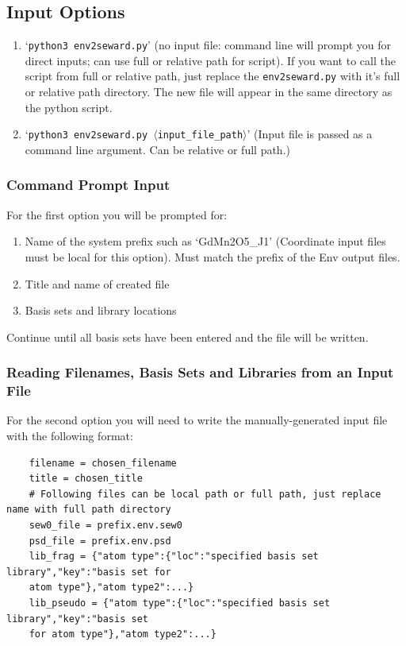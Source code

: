 \subsection{Input Options}

\begin{enumerate}
	\item `\texttt{python3 env2seward.py}' (no input file: command line will prompt you for direct inputs; can use full or relative path for script). If you want to call the script from full or relative path, just replace the \texttt{env2seward.py} with it's full or relative path directory. The new file will appear in the same directory as the python script.
	\item `\texttt{python3 env2seward.py $\langle$input\_file\_path$\rangle$}' (Input file is passed as a command line argument. Can be relative or full path.)
\end{enumerate}

\subsubsection{Command Prompt Input}
For the first option you will be prompted for:

\begin{enumerate}
	\item Name of the system prefix such as `GdMn2O5\_J1' (Coordinate input files must be local for this option). Must match the prefix of the Env output files.
	\item Title and name of created file
	\item Basis sets and library locations
\end{enumerate} 

Continue until all basis sets have been entered and the file will be written.

\subsubsection{Reading Filenames, Basis Sets and Libraries from an Input File}
For the second option you will need to write the manually-generated input file with the following format:

\begin{lstlisting}
	filename = chosen_filename
	title = chosen_title
	# Following files can be local path or full path, just replace name with full path directory
	sew0_file = prefix.env.sew0
	psd_file = prefix.env.psd
	lib_frag = {"atom type":{"loc":"specified basis set library","key":"basis set for
	atom type"},"atom type2":...}
	lib_pseudo = {"atom type":{"loc":"specified basis set library","key":"basis set
	for atom type"},"atom type2":...}
\end{lstlisting}

